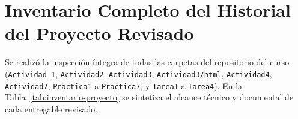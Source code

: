 \documentclass[letterpaper,11pt]{article}
\begin{document}
\section{Inventario Completo del Historial del Proyecto Revisado}

Se realizó la inspección íntegra de todas las carpetas del repositorio del curso (\texttt{Actividad 1}, \texttt{Actividad2}, \texttt{Actividad3}, \texttt{Actividad3/html}, \texttt{Actividad4}, \texttt{Actividad7}, \texttt{Practica1} a \texttt{Practica7}, y \texttt{Tarea1} a \texttt{Tarea4}). En la Tabla~\ref{tab:inventario-proyecto} se sintetiza el alcance técnico y documental de cada entregable revisado.

\begingroup
\footnotesize
\setlength{\tabcolsep}{4pt}
\renewcommand{\arraystretch}{1.22}
\end{document}
